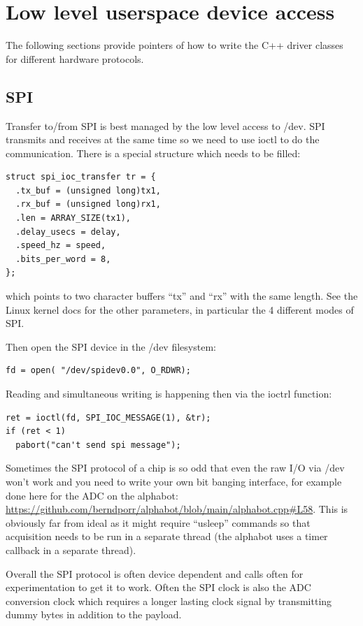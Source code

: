 \documentclass[12pt]{article}
\begin{document}
\section{Low level userspace device access}
The following sections provide pointers of how to write
the C++ driver classes for different hardware protocols.

\subsection{SPI}
Transfer to/from SPI is best managed by the low level access to /dev.
SPI transmits and receives at the same time so we need to
use ioctl to do the communication. There is a special structure
which needs to be filled:
\begin{verbatim}
struct spi_ioc_transfer tr = {
  .tx_buf = (unsigned long)tx1,
  .rx_buf = (unsigned long)rx1,
  .len = ARRAY_SIZE(tx1),
  .delay_usecs = delay,
  .speed_hz = speed,
  .bits_per_word = 8,
};
\end{verbatim}
which points to two character buffers ``tx'' and ``rx'' with the
same length. See the Linux kernel docs for the other parameters,
in particular the 4 different modes of SPI.

Then open the SPI device in the /dev filesystem:
\begin{verbatim}
fd = open( "/dev/spidev0.0", O_RDWR);
\end{verbatim}

Reading and simultaneous writing is happening then via the ioctrl
function:
\begin{verbatim}
ret = ioctl(fd, SPI_IOC_MESSAGE(1), &tr);
if (ret < 1)
  pabort("can't send spi message");	  
\end{verbatim}

Sometimes the SPI protocol of a chip is so odd that even the raw
I/O via /dev won't work and you need to write your own bit banging
interface, for example done here for the ADC on the alphabot:
\url{https://github.com/berndporr/alphabot/blob/main/alphabot.cpp#L58}.
This is obviously far from ideal as it might require ``usleep'' commands
so that acquisition needs to be run in a separate thread (the alphabot
uses a timer callback in a separate thread).

Overall the SPI protocol is often device dependent and calls often
for experimentation to get it to work. Often the SPI clock is also
the ADC conversion clock which requires a longer lasting clock signal
by transmitting dummy bytes in addition to the payload.
\end{document}
